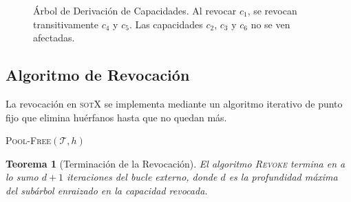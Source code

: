 \documentclass[11pt,twoside,openright]{book}
\theoremstyle{definition}
\theoremstyle{plain}
\newtheorem{theorem}{Teorema}[chapter]
\theoremstyle{remark}
\newcommand{\sotos}{\textsc{sotX}}
\begin{document}
\begin{figure}[ht]
\caption{Árbol de Derivación de Capacidades. Al revocar $c_1$, se revocan transitivamente
$c_4$ y $c_5$. Las capacidades $c_2$, $c_3$ y $c_6$ no se ven afectadas.}
\label{fig:cdt}
\end{figure}

\subsection{Algoritmo de Revocación}

La revocación en \sotos{} se implementa mediante un algoritmo iterativo de punto fijo que
elimina huérfanos hasta que no quedan más.

\begin{algorithm}[H]
\caption{\textsc{Revoke}$(\mathcal{T}, h)$: Revocar una capacidad y todas sus derivadas.}
\label{alg:revoke}
\textsc{Pool-Free}$(\mathcal{T}, h)$
\end{algorithm}

\begin{theorem}[Terminación de la Revocación]
\label{thm:revoke-terminates}
El algoritmo \textsc{Revoke} termina en a lo sumo $d + 1$ iteraciones del bucle externo,
donde $d$ es la profundidad máxima del subárbol enraizado en la capacidad revocada.
\end{theorem}
\end{document}
